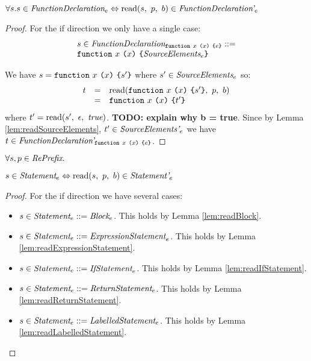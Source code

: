 \documentclass[preprint,10pt]{sigplanconf}
\begin{document}
\begin{lemma}\mbox{}
  
  \( \forall s. s \in \textit{FunctionDeclaration}_{e} \Leftrightarrow 
  \textrm{read}(s,~p,~b) \in \textit{FunctionDeclaration'}_{e} \)
\end{lemma}
\begin{proof}
  For the if direction we only have a single case: 
  \[ 
  \begin{array}{lcl}
  s \in
  \textit{FunctionDeclaration}_{\texttt{function}~x~\texttt{(}x\texttt{)}~\texttt{\{}e\texttt{\}}}
  ::= 
  \\
  \texttt{function}~x~\texttt{(}x\texttt{)}~\texttt{\{}\textit{SourceElements}_{e}\texttt{\}}
  \end{array}
  \]

 We have \( s = \texttt{function}~x~\texttt{(}x\texttt{)}~\texttt{\{}s'\texttt{\}}
 \) where \( s' \in \textit{SourceElements}_{e} \) so:
 \[
 \begin{array}{rcl}
   t &=& \textrm{read}(\texttt{function}~x~\texttt{(}x\texttt{)}~\texttt{\{}s'\texttt{\}},~p,~b)
   \\
   &=& \texttt{function}~x~\texttt{(}x\texttt{)}~\texttt{\{}t'\texttt{\}}
 \end{array}
 \]
 where \( t' = \textrm{read}(s',~\epsilon,~\textit{true}) \). \textbf{TODO:
   explain why b = true}. Since by Lemma \ref{lem:readSourceElements},
 \( t' \in \textit{SourceElements'}_{e} \) we have \( t \in \textit{FunctionDeclaration'}_{\texttt{function}~x~\texttt{(}x\texttt{)}~\texttt{\{}e\texttt{\}}} \).
\end{proof}

\begin{lemma}\mbox{}
  
  \( \forall s, p \in \textit{RePrefix}. \)

  \( s \in \textit{Statement}_{e} \Leftrightarrow 
  \textrm{read}(s,~p,~b) \in \textit{Statement'}_{e} \)
\end{lemma}
\begin{proof}
  For the if direction we have several cases:
  \begin{itemize}
  \item \( s \in \textit{Statement}_{e} ::= \textit{Block}_{e} \). This
    holds by Lemma \ref{lem:readBlock}.

  \item \( s \in \textit{Statement}_{e} ::= \textit{ExpressionStatement}_{e} \). This
    holds by Lemma \ref{lem:readExpressionStatement}.

  \item \( s \in \textit{Statement}_{e} ::= \textit{IfStatement}_{e} \). This
    holds by Lemma \ref{lem:readIfStatement}.

  \item \( s \in \textit{Statement}_{e} ::= \textit{ReturnStatement}_{e} \). This
    holds by Lemma \ref{lem:readReturnStatement}.

  \item \( s \in \textit{Statement}_{e} ::= \textit{LabelledStatement}_{e} \). This
    holds by Lemma \ref{lem:readLabelledStatement}.
  \end{itemize}
\end{proof}
\end{document}

